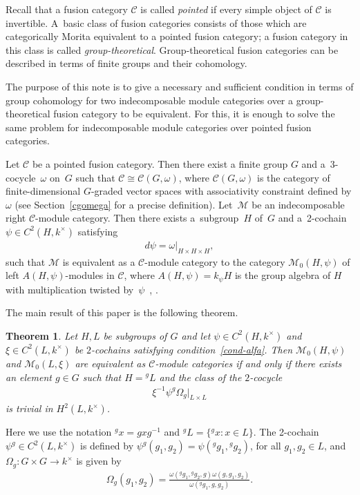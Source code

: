 \documentclass[pdftex]{sigma}
\numberwithin{equation}{section}
\newtheorem{Theorem}{Theorem}[section]
\newcommand{\cch}{\Omega}
\newcommand{\C}{{\mathcal C}}
\newcommand{\M}{{\mathcal M}}
\newcommand{\1}{\textbf{1}}
\begin{document}
Recall that a fusion category $\C$ is called \emph{pointed} if every simple object of $\C$ is invertible. A~basic class of fusion categories consists of those which are categorically Morita equivalent to a pointed fusion category; a fusion category in this class is called \emph{group-theoretical}. Group-theoretical fusion categories can be described in terms of f\/inite groups and their cohomology.

The purpose of this note is to give a necessary and suf\/f\/icient condition in terms of group cohomology for two indecomposable module categories over a group-theoretical fusion category to be equivalent. For this, it is enough to solve the same problem for indecomposable module categories over pointed fusion categories.

Let $\C$ be a pointed fusion category. Then there exist a f\/inite group $G$ and a~3-cocycle~$\omega$ on~$G$ such that $\C \cong \C(G, \omega)$, where $\C(G, \omega)$ is the category of f\/inite-dimensional $G$-graded vector spaces with associativity constraint def\/ined by $\omega$ (see Section~\ref{cgomega} for a precise def\/inition). Let~$\M$ be an indecomposable right $\C$-module category. Then there exists a~subgroup~$H$ of~$G$ and a~2-cochain $\psi \in C^2(H, k^{\times})$ satisfying
\begin{gather}
\label{cond-alfa}d\psi = \omega\vert_{H \times H \times H},
\end{gather}
such that $\M$ is equivalent as a $\C$-module category to the category $\M_0(H, \psi)$ of left $A(H, \psi)$-modules in $\C$, where $A(H, \psi) = k_\psi H$ is the group algebra of $H$ with multiplication twisted by~$\psi$~\cite{ostrik}, \cite[Example~9.7.2]{egno}.

The main result of this paper is the following theorem.

\begin{Theorem}\label{main} Let $H, L$ be subgroups of $G$ and let $\psi \in C^2(H, k^{\times})$ and $\xi \in C^2(L, k^{\times})$ be $2$-cochains satisfying condition~\eqref{cond-alfa}. Then $\M_0(H, \psi)$ and $\M_0(L, \xi)$ are equivalent as $\C$-module categories if and only if there exists an element $g \in G$ such that $H = {}^gL$ and the class of the $2$-cocycle
\begin{gather}\label{cond-equiv} {\xi}^{-1}{\psi}^g \cch_g\vert_{L\times L}
\end{gather}
is trivial in $H^2(L, k^{\times})$.
\end{Theorem}

Here we use the notation ${}^g x = gxg^{-1}$ and $^gL = \{{}^g x\colon x\in L\}$. The 2-cochain ${\psi}^g \in C^2(L, k^{\times})$ is def\/ined by ${\psi}^g(g_1, g_2) = {\psi}({}^gg_1, {}^gg_2)$, for all $g_1, g_2 \in L$, and $\cch_g\colon G \times G \to k^{\times}$ is given by
\begin{gather*}\cch_g(g_1, g_2) = \frac{\omega({}^gg_1, {}^gg_2, g) \omega(g, g_1, g_2)}{\omega({}^gg_1, g, g_2)}.
\end{gather*}
\end{document}

